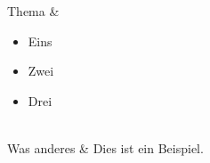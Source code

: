 \documentclass{handout}
\begin{document}
\maketitle

\begin{2col}
  Thema &
    \begin{itemize}
        \item Eins
        \item Zwei
        \item Drei
    \end{itemize}
  \\
  Was anderes &
    Dies ist ein Beispiel.
\end{2col}

\newpage
\nocite{*}
\printbibliography{}
\end{document}
